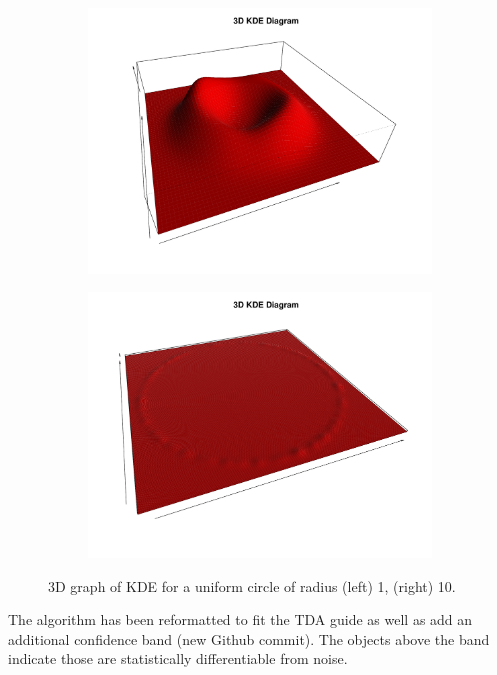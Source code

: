 \documentclass[a4paper]{article}
\begin{document}
\begin{figure}[htp!]
\centering
\begin{subfigure}{.5\textwidth}
  \centering
  \includegraphics[width=\linewidth]{topograph}
\end{subfigure}%
\begin{subfigure}{.5\textwidth}
  \centering
  \includegraphics[width=\linewidth]{topograph2}
\end{subfigure}
\caption{3D graph of KDE for a uniform circle of radius (left) 1, (right) 10. }
\end{figure}

The algorithm has been reformatted to fit the TDA guide as well as add an additional confidence band (new Github commit). The objects above the band indicate those are statistically differentiable from noise. 
\end{document}
